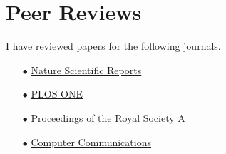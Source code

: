 \documentclass[a4paper,10pt]{article}
\begin{document}
\section*{Peer Reviews}
I have reviewed papers for the following journals.
\begin{itemize}
	\item[$\bullet$] \href{https://www.nature.com/srep/}{Nature Scientific Reports}
	\item[$\bullet$] \href{https://journals.plos.org/plosone/}{PLOS ONE}
	\item[$\bullet$] \href{https://royalsocietypublishing.org/journal/rspa}{Proceedings of the Royal Society A}
	\item[$\bullet$] \href{https://www.journals.elsevier.com/computer-communications}{Computer Communications}
\end{itemize}

 \thispagestyle{empty} %
\end{document}
